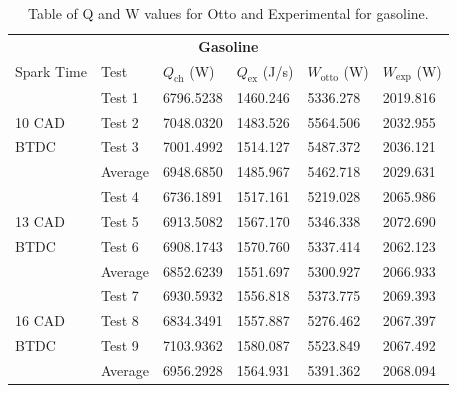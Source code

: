 \documentclass[11pt]{article}
\begin{document}
\begin{table}[H]
	\begin{center}
	\begin{tabular}{@{}l l l l l l@{}}
		\toprule
		\multicolumn{6}{c}{\textbf{Gasoline}} \\
		Spark Time & Test & $Q_\textrm{ch}$ (W) & $Q_\textrm{ex}$ (J/s) & $W_\textrm{otto}$ (W) & $W_\textrm{exp}$ (W) \\ 
		\midrule
				& Test 1  & 6796.5238 & 1460.246 & 5336.278 & 2019.816\\
		10 CAD	& Test 2  & 7048.0320 & 1483.526 & 5564.506 & 2032.955\\
		BTDC	& Test 3  & 7001.4992 & 1514.127 & 5487.372 & 2036.121\\
				& Average & 6948.6850 & 1485.967 & 5462.718 & 2029.631\\
				& Test 4  & 6736.1891 & 1517.161 & 5219.028 & 2065.986\\
		13 CAD	& Test 5  & 6913.5082 & 1567.170 & 5346.338 & 2072.690\\
		BTDC	& Test 6  & 6908.1743 & 1570.760 & 5337.414 & 2062.123\\
				& Average & 6852.6239 & 1551.697 & 5300.927 & 2066.933\\	
				& Test 7  & 6930.5932 & 1556.818 & 5373.775 & 2069.393\\
		16 CAD	& Test 8  & 6834.3491 & 1557.887 & 5276.462 & 2067.397\\
		BTDC	& Test 9  & 7103.9362 & 1580.087 & 5523.849 & 2067.492\\
				& Average & 6956.2928 & 1564.931 & 5391.362 & 2068.094\\		
		\bottomrule
	\end{tabular}
	\caption{Table of Q and W values for Otto and Experimental for gasoline.}
	\label{q4-t4}
	\end{center}
\end{table}
\end{document}
